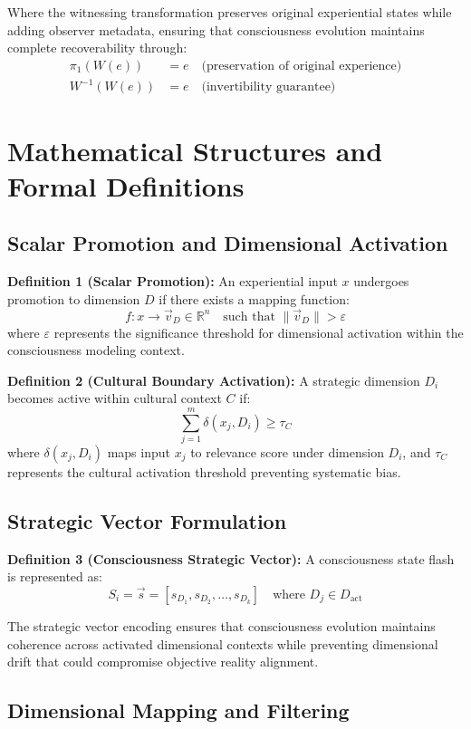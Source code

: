 \documentclass[12pt]{article}
\begin{document}
Where the witnessing transformation preserves original experiential states while adding observer metadata, ensuring that consciousness evolution maintains complete recoverability through:
\begin{align}
\pi_1(W(e)) &= e \quad \text{(preservation of original experience)}\\
W^{-1}(W(e)) &= e \quad \text{(invertibility guarantee)}
\end{align}

\section{Mathematical Structures and Formal Definitions}

\subsection{Scalar Promotion and Dimensional Activation}

\textbf{Definition 1 (Scalar Promotion):} An experiential input $x$ undergoes promotion to dimension $D$ if there exists a mapping function:
\[
f: x \rightarrow \vec{v}_D \in \mathbb{R}^n \quad \text{such that } \|\vec{v}_D\| > \varepsilon
\]
where $\varepsilon$ represents the significance threshold for dimensional activation within the consciousness modeling context.

\textbf{Definition 2 (Cultural Boundary Activation):} A strategic dimension $D_i$ becomes active within cultural context $C$ if:
\[
\sum_{j=1}^m \delta(x_j, D_i) \geq \tau_C
\]
where $\delta(x_j, D_i)$ maps input $x_j$ to relevance score under dimension $D_i$, and $\tau_C$ represents the cultural activation threshold preventing systematic bias.

\subsection{Strategic Vector Formulation}

\textbf{Definition 3 (Consciousness Strategic Vector):} A consciousness state flash is represented as:
\[
S_i = \vec{s} = [s_{D_1}, s_{D_2}, \ldots, s_{D_k}] \quad \text{where } D_j \in D_{\text{act}}
\]

The strategic vector encoding ensures that consciousness evolution maintains coherence across activated dimensional contexts while preventing dimensional drift that could compromise objective reality alignment.

\subsection{Dimensional Mapping and Filtering}
\end{document}
